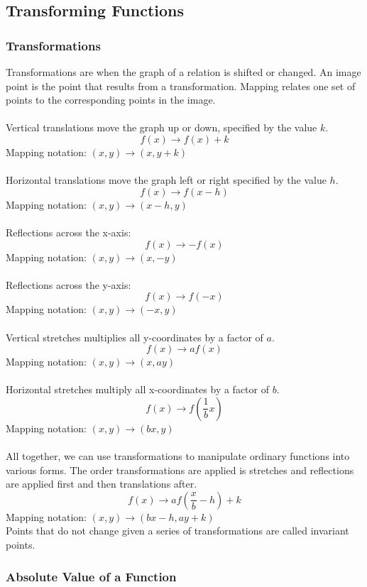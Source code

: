 \subsection{Transforming Functions}

\subsubsection{Transformations}
Transformations are when the graph of a relation is shifted or changed. An image point is the point that results from a transformation. Mapping relates one set of points to the corresponding points in the image.\\
\\
Vertical translations move the graph up or down, specified by the value $k$.
$$f(x)\rightarrow f(x)+k$$
Mapping notation: $(x,y)\rightarrow(x,y+k)$\\
\\
Horizontal translations move the graph left or right specified by the value $h$.
$$f(x)\rightarrow f(x-h)$$
Mapping notation: $(x,y)\rightarrow(x-h,y)$\\
\\
Reflections across the x-axis:
$$f(x)\rightarrow -f(x)$$
Mapping notation: $(x,y)\rightarrow (x,-y)$\\
\\
Reflections across the y-axis:
$$f(x)\rightarrow f(-x)$$
Mapping notation: $(x,y)\rightarrow(-x,y)$\\
\\
Vertical stretches multiplies all y-coordinates by a factor of $a$.
$$f(x)\rightarrow af(x)$$
Mapping notation: $(x,y)\rightarrow (x,ay)$\\
\\
Horizontal stretches multiply all x-coordinates by a factor of $b$.
$$f(x)\rightarrow f\left(\frac{1}{b}x\right)$$
Mapping notation: $(x,y)\rightarrow(bx,y)$\\
\\
All together, we can use transformations to manipulate ordinary functions into various forms. The order transformations are applied is stretches and reflections are applied first and then translations after.
$$f(x)\rightarrow af\left(\frac{x}{b}-h\right)+k$$
Mapping notation: $(x,y)\rightarrow (bx-h,ay+k)$\\
Points that do not change given a series of transformations are called invariant points.

\subsubsection{Absolute Value of a Function}

